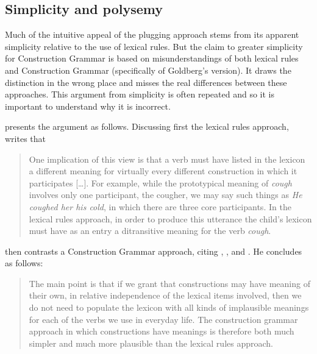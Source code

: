 \subsection{Simplicity and polysemy}\label{polysemy-subsec}

Much of the intuitive appeal of the plugging approach stems from its apparent simplicity relative to
the use of lexical rules.  But the claim to greater simplicity for Construction Grammar is based on
misunderstandings of both lexical rules and Construction Grammar (specifically of Goldberg's \citeyearpar{Goldberg95a,Goldberg2006a} version).   It draws the distinction in the wrong place and misses the real differences
between these approaches.  This argument from simplicity is often repeated and so it is important to
understand why it is incorrect.    

\citet{Tomasello2003a} presents the argument as follows.  Discussing first the lexical rules approach, \citet[]{Tomasello2003a} writes that 

\begin{quote}
One implication of this view is that a verb must have listed in the lexicon a different meaning for
virtually every different construction in which it participates [\ldots].  For example, while the
prototypical meaning of \emph{cough} involves only one participant, the cougher, we may say such
things as \emph{He coughed her his cold}, in which there are three core participants.  In the
lexical rules approach, in order to produce this utterance the child's lexicon must have as an entry
a ditransitive meaning for the verb \emph{cough}. \citep[]{Tomasello2003a}
\end{quote}
\citet[]{Tomasello2003a} then contrasts a Construction Grammar approach, citing \citet{FKoC88a}, \citet{Goldberg95a}, and \citet{Croft2001a}.  He concludes as follows:

\begin{quote}
The main point is that if we grant that constructions may have meaning of their own, in relative
independence of the lexical items involved, then we do not need to populate the lexicon with all
kinds of implausible meanings for each of the verbs we use in everyday life.  The construction
grammar approach in which constructions have meanings is therefore both much simpler and much more
plausible than the lexical rules approach.  \citep[]{Tomasello2003a}
\end{quote}

